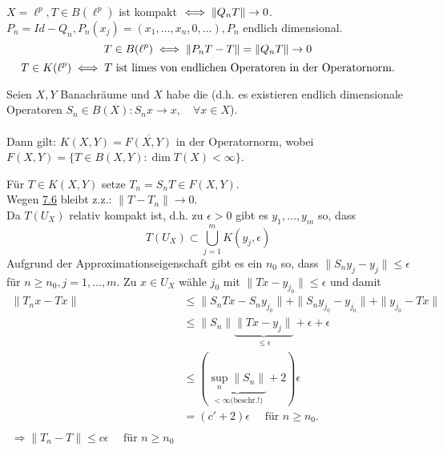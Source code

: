 \begin{beispiel*}
	$X = \ell^{p}, T \in B(\ell^{p})$ ist kompakt $\iff \| Q_{n} T \| \rightarrow 0$. \\
	$P_{n} = Id - Q_{n}, P_{n}(x_{j}) = (x_{1}, \dotsc, x_{n}, 0, \dotsc), P_{n}$ endlich dimensional. \\
	\[ T \in B(\ell^{p}) \iff \| P_{n} T - T \| = \| Q_{n} T \| \rightarrow 0 \]
	\[ T \in K(\ell^{p}) \iff T \text{ ist limes von endlichen Operatoren in der Operatornorm.} \]
\end{beispiel*}

\begin{satz}
	Seien $X, Y$ Banachräume und $X$ habe die  (d.h. es existieren endlich dimensionale Operatoren $S_{n} \in B(X): S_{n} x \rightarrow x, \quad \forall x \in X$). \\ \\
	Dann gilt: $K(X, Y) = \overline{F(X, Y)}$ in der Operatornorm, wobei $F(X, Y) = \{ T \in B(X, Y): \dim T(X) < \infty \}$.
\end{satz}
\begin{beweis}
	Für $T \in K(X, Y)$ setze $T_{n} = S_{n} T \in F(X, Y)$. \\
	Wegen \hyperref[kor:7.6]{7.6} bleibt z.z.: $\| T - T_{n} \| \rightarrow 0$. \\
	Da $T(U_{X})$ relativ kompakt ist, d.h. zu $\epsilon > 0$ gibt es $y_{1}, \dotsc, y_{m}$ so, dass
	\[ T(U_{X}) \subset \bigcup_{j = 1}^{m} K(y_{j}, \epsilon) \]
	Aufgrund der Approximationseigenschaft gibt es ein $n_{0}$ so, dass  $\| S_{n} y_{j} - y_{j} \| \leq \epsilon$ für $n \geq n_{0}, j = 1, \dotsc, m$. Zu $x \in U_{X}$ wähle $j_{0}$ mit $\| Tx - y_{j_{0}} \| \leq \epsilon$ und damit
	\begin{align*}
		\| T_{n} x - T x \| & \leq \| S_{n} T x - S_{n} y_{j_{0}} \| + \| S_{n} y_{j_{0}} - y_{j_{0}} \| + \| y_{j_{0}}- Tx \| \\
			& \leq \| S_{n} \| \underbrace{\| T x - y_{j} \|}_{\leq \epsilon} + \epsilon + \epsilon \\
			& \leq \left( \underbrace{\sup_{n} \| S_{n} \|}_{< \infty \text{(beschr.!)}} + 2 \right) \epsilon \\
			& = \left( c' + 2 \right) \epsilon \quad \text{ für } n \geq n_{0}. \\ \\
			\Rightarrow \| T_{n} - T \| \leq c \epsilon \quad \text{ für } n \geq n_{0}
	\end{align*}
	\[  \]
\end{beweis}


\newpage






























	